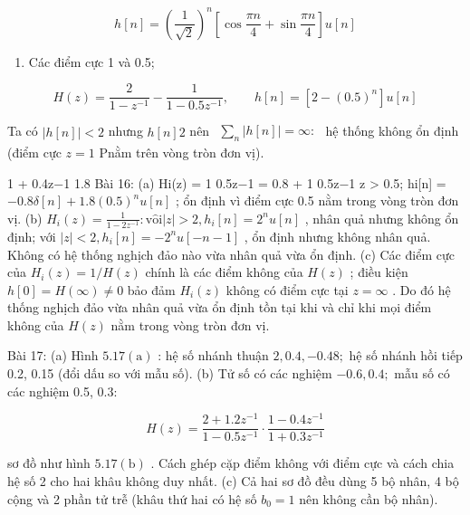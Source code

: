 \documentclass[
  10
]{article}
\providecommand{\tightlist}{%
  \setlength{\itemsep}{0pt}\setlength{\parskip}{0pt}}
\begin{document}
\[
h [ n ] = \left(\frac {1}{\sqrt {2}}\right) ^ {n} \left[ \cos {\frac {\pi n}{4}} + \sin {\frac {\pi n}{4}} \right] u [ n ]
\]

\begin{enumerate}
\def\labelenumi{(\alph{enumi})}
\setcounter{enumi}{2}
\tightlist
\item
  Các điểm cực 1 và 0.5;
\end{enumerate}

\[
H (z) = \frac {2}{1 - z ^ {- 1}} - \frac {1}{1 - 0 . 5 z ^ {- 1}}, \qquad h [ n ] = [ 2 - (0. 5) ^ {n} ] u [ n ]
\]

Ta có \(| h [ n ] | < 2\) nhưng \(h [ n ]  2\) nên
\(\begin{array} { r } { \sum _ { n } | h [ n ] | = \infty : } \end{array}\)
hệ thống không ổn định (điểm cực \(z = 1\) Pnằm trên vòng tròn đơn vị).

1 + 0.4z−1 1.8 Bài 16: (a) Hi(z) = 1 0.5z−1 = 0.8 + 1 0.5z−1
\textbar{}z\textbar{} \textgreater{} 0.5; hi{[}n{]} =
\(- 0 . 8 \delta [ n ] + 1 . 8 ( 0 . 5 ) ^ { n } u [ n ]\) ; ổn định vì
điểm cực 0.5 nằm trong vòng tròn đơn vị. (b)
\(H _ { i } ( z ) = { \frac { 1 } { 1 - 2 z ^ { - 1 } } } \colon \operatorname { v \hat { o } i } | z | > 2 , h _ { i } [ n ] = 2 ^ { n } u [ n ]\)
, nhân quả nhưng không ổn định; với
\(| z | < 2 , h _ { i } [ n ] = - 2 ^ { n } u [ - n - 1 ]\) , ổn định
nhưng không nhân quả. Không có hệ thống nghịch đảo nào vừa nhân quả vừa
ổn định. (c) Các điểm cực của \(H _ { i } ( z ) = 1 / H ( z )\) chính là
các điểm không của \(H ( z )\) ; điều kiện
\(h [ 0 ] = H ( \infty ) \neq 0\) bảo đảm \(H _ { i } ( z )\) không có
điểm cực tại \(z = \infty\) . Do đó hệ thống nghịch đảo vừa nhân quả vừa
ổn định tồn tại khi và chỉ khi mọi điểm không của \(H ( z )\) nằm trong
vòng tròn đơn vị.

Bài 17: (a) Hình \(5 . 1 7 ( \mathrm { a } )\) : hệ số nhánh thuận
\(2 , 0 . 4 , - 0 . 4 8 ;\) hệ số nhánh hồi tiếp 0.2, 0.15 (đổi dấu so
với mẫu số). (b) Tử số có các nghiệm \(- 0 . 6 , 0 . 4 ;\) mẫu số có các
nghiệm 0.5, 0.3:

\[
H (z) = \frac {2 + 1 . 2 z ^ {- 1}}{1 - 0 . 5 z ^ {- 1}} \cdot \frac {1 - 0 . 4 z ^ {- 1}}{1 + 0 . 3 z ^ {- 1}}
\]

sơ đồ như hình \(5 . 1 7 ( \mathrm { b } )\) . Cách ghép cặp điểm không
với điểm cực và cách chia hệ số 2 cho hai khâu không duy nhất. (c) Cả
hai sơ đồ đều dùng 5 bộ nhân, 4 bộ cộng và 2 phần tử trễ (khâu thứ hai
có hệ số \(b _ { 0 } = 1\) nên không cần bộ nhân).
\end{document}
